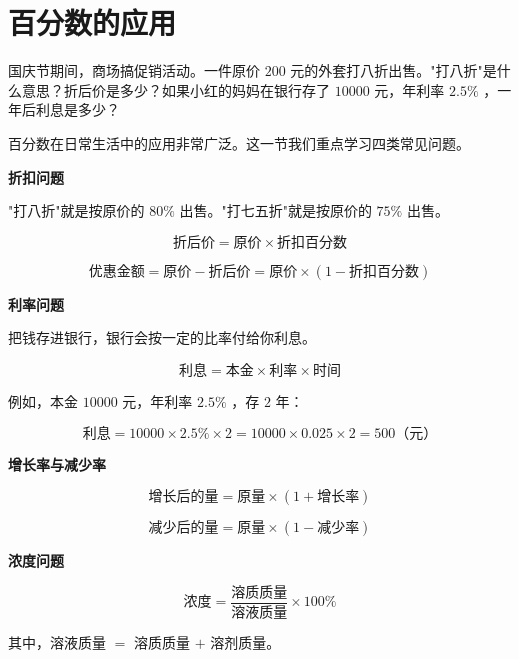 \section*{百分数的应用}


\begin{explore}


国庆节期间，商场搞促销活动。一件原价 $200$ 元的外套打八折出售。"打八折"是什么意思？折后价是多少？如果小红的妈妈在银行存了 $10000$ 元，年利率 $2.5\%$ ，一年后利息是多少？

百分数在日常生活中的应用非常广泛。这一节我们重点学习四类常见问题。

\end{explore}

\begin{understand}


\textbf{折扣问题}

"打八折"就是按原价的 $80\%$ 出售。"打七五折"就是按原价的 $75\%$ 出售。

\[
\text{折后价} = \text{原价} \times \text{折扣百分数}
\]


\[
\text{优惠金额} = \text{原价} - \text{折后价} = \text{原价} \times (1 - \text{折扣百分数})
\]


\textbf{利率问题}

把钱存进银行，银行会按一定的比率付给你利息。

\[
\text{利息} = \text{本金} \times \text{利率} \times \text{时间}
\]


例如，本金 $10000$ 元，年利率 $2.5\%$ ，存 $2$ 年：

\[
\text{利息} = 10000 \times 2.5\% \times 2 = 10000 \times 0.025 \times 2 = 500 \text{（元）}
\]


\textbf{增长率与减少率}

\[
\text{增长后的量} = \text{原量} \times (1 + \text{增长率})
\]


\[
\text{减少后的量} = \text{原量} \times (1 - \text{减少率})
\]


\textbf{浓度问题}

\[
\text{浓度} = \frac{\text{溶质质量}}{\text{溶液质量}} \times 100\%
\]


其中，溶液质量 $=$ 溶质质量 $+$ 溶剂质量。

\end{understand}

